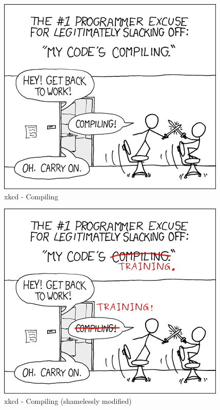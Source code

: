 \documentclass[aspectratio=169]{beamer}
\begin{document}
\begin{frame}
	\begin{center}
		\begin{figure}
			\includegraphics[scale=0.5]{imgs/xkcd_compiling.png}
			\caption{xkcd - Compiling}
		\end{figure}
	\end{center}
\end{frame}

\begin{frame}
	\begin{center}
		\begin{figure}
			\includegraphics[scale=0.5]{imgs/xkcd_training.png}
			\caption{xkcd - Compiling (shamelessly modified)}
		\end{figure}
	\end{center}
\end{frame}
\end{document}
